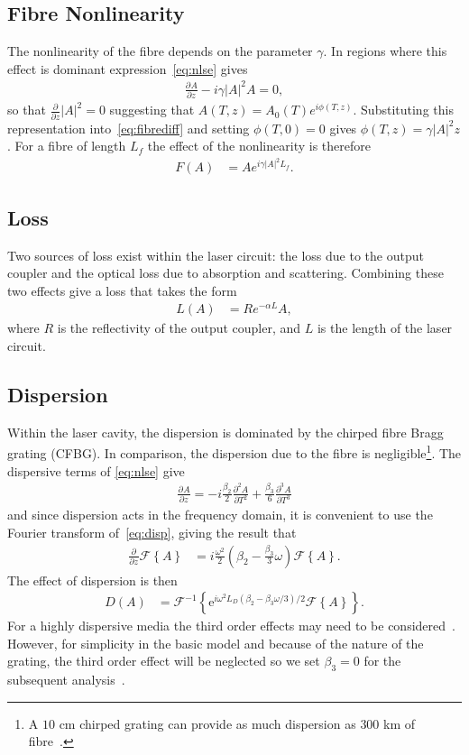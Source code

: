 \documentclass[12pt]{article}
\newcommand{\pdiff}[3][]{\frac{\partial^{#1}#2}{\partial{#3}^{#1}}}
\newcommand{\FT}[1]{\mathcal{F}\left\{ #1 \right\}}
\newcommand{\FTi}[1]{\mathcal{F}^{-1}\left\{ #1 \right\}}
\begin{document}
\subsection{Fibre Nonlinearity}
The nonlinearity of the fibre depends on the parameter $\gamma$. In regions where this effect is dominant expression~\eqref{eq:nlse} gives
\begin{align}
\label{eq:fibrediff}
	\pdiff{A}{z} - i \gamma |A|^2 A = 0,
\end{align}
so that $\frac{\partial}{\partial z} |A|^2 = 0$ suggesting that $A(T,z) = A_0(T) e^{i \phi(T,z)}$. Substituting this representation into~\eqref{eq:fibrediff} and setting $\phi(T,0)=0$ gives $\phi(T,z) = \gamma |A|^2 z$. For a fibre of length $L_f$ the effect of the nonlinearity is therefore
\begin{align}
\label{eq:fibre}
	F(A) &= A e^{i \gamma |A|^2 L_f}.
\end{align}

\subsection{Loss}
Two sources of loss exist within the laser circuit: the loss due to the output coupler and the optical loss due to absorption and scattering. Combining these two effects give a loss that takes the form
\begin{align}
\label{eq:fibreloss}
	L(A) &= R e^{- \alpha L}A,
\end{align}
where $R$ is the reflectivity of the output coupler, and $L$ is the length of the laser circuit.

\subsection{Dispersion}
Within the laser cavity, the dispersion is dominated by the chirped fibre Bragg grating (CFBG). In comparison, the dispersion due to the fibre is negligible\footnote{A $10$ cm chirped grating can provide as much dispersion as $300$ km of fibre~\cite{agrawal2002}.}. The dispersive terms of \eqref{eq:nlse} give
\begin{align}
\label{eq:disp}
	\pdiff{A}{z} = -i \frac{\beta_2}{2} \pdiff[2]{A}{T} + \frac{\beta_3}{6} \pdiff[3]{A}{T}
\end{align}
and since dispersion acts in the frequency domain, it is convenient to use the Fourier transform of~\eqref{eq:disp}, giving the result that
\begin{align*}
	\pdiff{}{z}\FT{A} &= i\frac{\omega^2}{2}\left(\beta_2 - \frac{\beta_3}{3} \omega\right) \FT{A}.
\end{align*}
The effect of dispersion is then
\begin{align}
\label{eq:dispersion}
	D(A) &= \FTi{\textrm{e}^{i \omega^2 L_D(\beta_2 - \beta_3 \omega/3)/2} \FT{A}}.
\end{align}
For a highly dispersive media the third order effects may need to be considered~\cite{agrawal2013, litchinitser}. However, for simplicity in the basic model and because of the nature of the grating, the third order effect will be neglected so we set $\beta_3=0$ for the subsequent analysis~\cite{agrawal2013, ferreira}.
\end{document}

